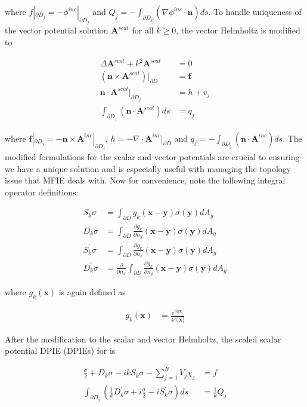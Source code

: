 \documentclass{article}[12pt]
\newcommand{\bvec}[1]{\boldsymbol{#1}}
\begin{document}
	where $f|_{\partial D_j} = - \phi^{inc}|_{\partial D_j}$ and $Q_j = - \int_{\partial D_j} \left( \nabla \phi^{inc} \cdot \bvec{n}\right) ds$. To handle uniqueness of the vector potential solution $\bvec{A}^{scat}$ for all $k \geq 0$, the vector Helmholtz is modified to
	
	\begin{align*}
	\Delta \bvec{A}^{scat} + k^2 \bvec{A}^{scat} &= 0 \\
	\left(\bvec{n} \times \bvec{A}^{scat}\right)|_{\partial D} &= \bvec{f} \\
	\bvec{n} \cdot \bvec{A}^{scat}|_{\partial D_j} &= h + v_j \\
	\int_{\partial D_j} \left( \bvec{n} \cdot \bvec{A}^{scat} \right) ds &= q_j
	\end{align*}
	
	where $\bvec{f}|_{\partial D_j} = - \bvec{n} \times \bvec{A}^{inc}|_{\partial D_j}$, $h = - \nabla \cdot \bvec{A}^{inc}|_{\partial D}$ and $q_j = - \int_{\partial D_j} \left( \bvec{n} \cdot \bvec{A}^{inc} \right) ds$. The modified formulations for the scalar and vector potentials are crucial to ensuring we have a unique solution and is especially useful with managing the topology issue that MFIE deals with. Now for convenience, note the following integral operator definitions:
	
	\begin{align*}
	S_k \sigma &= \int_{\partial D} g_k (\bvec{x} - \bvec{y}) \sigma(\bvec{y}) dA_y \\
	D_k \sigma &= \int_{\partial D} \frac{\partial g_k}{\partial n_y} (\bvec{x} - \bvec{y}) \sigma(\bvec{y}) dA_y \\
	S_k^{'} \sigma &= \int_{\partial D} \frac{\partial g_k}{\partial n_x}  (\bvec{x} - \bvec{y}) \sigma(\bvec{y}) dA_y \\
	D_k^{'} \sigma &= \frac{\partial }{\partial n_x}  \int_{\partial D} \frac{\partial g_k}{\partial n_y}  (\bvec{x} - \bvec{y}) \sigma(\bvec{y}) dA_y
	\end{align*}
	
	where $g_k(\bvec{x})$ is again defined as
	
	\begin{align*}
	g_k(\bvec{x}) &= \frac{e^{i k |\bvec{x}|}}{4 \pi |\bvec{x}|}
	\end{align*}
	
	After the modification to the scalar and vector Helmholtz, the scaled scalar potential DPIE (DPIEs) for is
	
	\begin{align*}
	\frac{\sigma}{2} + D_{k}\sigma - i k S_k \sigma - \sum_{j=1}^N V_j \chi_j &= f \\
	\int_{\partial D_j} \left( \frac{1}{k} D_{k}^{'} \sigma + i \frac{\sigma}{2} - i S_k^{'}\sigma \right) ds &= \frac{1}{k}Q_j
	\end{align*}
	
\end{document}
